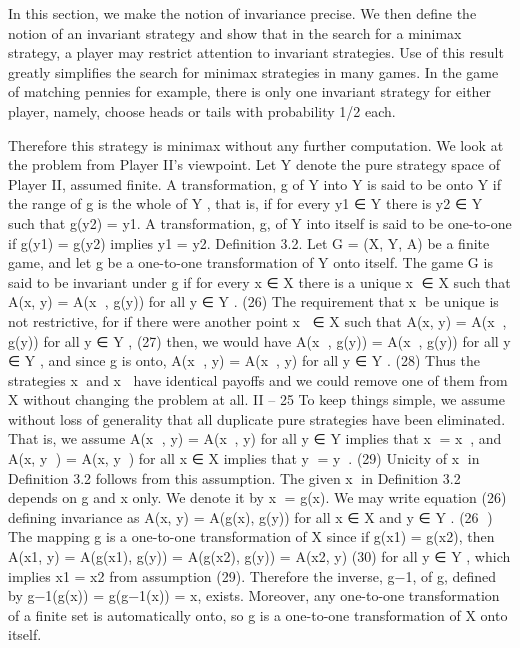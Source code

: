 In this section, we make the notion of invariance precise. We then define the notion of
an invariant strategy and show that in the search for a minimax strategy, a player may
restrict attention to invariant strategies. Use of this result greatly simplifies the search for
minimax strategies in many games. In the game of matching pennies for example, there is
only one invariant strategy for either player, namely, choose heads or tails with probability
1/2 each. 

Therefore this strategy is minimax without any further computation.
We look at the problem from Player II’s viewpoint. Let Y denote the pure strategy
space of Player II, assumed finite. A transformation, g of Y into Y is said to be onto Y
if the range of g is the whole of Y , that is, if for every y1 ∈ Y there is y2 ∈ Y such that
g(y2) = y1. A transformation, g, of Y into itself is said to be one-to-one if g(y1) = g(y2)
implies y1 = y2.
Definition 3.2. Let G = (X, Y, A) be a finite game, and let g be a one-to-one transformation
of Y onto itself. The game G is said to be invariant under g if for every x ∈ X
there is a unique x ∈ X such that
A(x, y) = A(x
, g(y)) for all y ∈ Y . (26)
The requirement that x be unique is not restrictive, for if there were another point
x ∈ X such that
A(x, y) = A(x, g(y)) for all y ∈ Y , (27)
then, we would have A(x
, g(y)) = A(x, g(y)) for all y ∈ Y , and since g is onto,
A(x
, y) = A(x, y) for all y ∈ Y . (28)
Thus the strategies x and x have identical payoffs and we could remove one of them from
X without changing the problem at all.
II – 25
To keep things simple, we assume without loss of generality that all duplicate pure
strategies have been eliminated. That is, we assume
A(x
, y) = A(x, y) for all y ∈ Y implies that x = x, and
A(x, y
) = A(x, y) for all x ∈ X implies that y = y. (29)
Unicity of x in Definition 3.2 follows from this assumption.
The given x in Definition 3.2 depends on g and x only. We denote it by x = g(x).
We may write equation (26) defining invariance as
A(x, y) = A(g(x), g(y)) for all x ∈ X and y ∈ Y . (26
)
The mapping g is a one-to-one transformation of X since if g(x1) = g(x2), then
A(x1, y) = A(g(x1), g(y)) = A(g(x2), g(y)) = A(x2, y) (30)
for all y ∈ Y , which implies x1 = x2 from assumption (29). Therefore the inverse, g−1, of
g, defined by g−1(g(x)) = g(g−1(x)) = x, exists. Moreover, any one-to-one transformation
of a finite set is automatically onto, so g is a one-to-one transformation of X onto itself.
